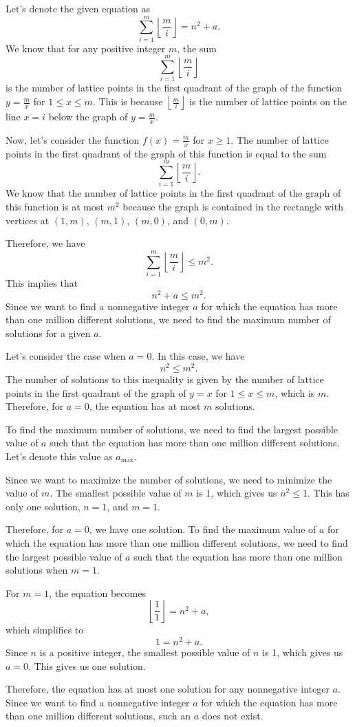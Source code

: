Let's denote the given equation as
\[
\sum_{i=1}^{m} \left\lfloor\frac{m}{i}\right\rfloor = n^2 + a.
\]
We know that for any positive integer \( m \), the sum
\[
\sum_{i=1}^{m} \left\lfloor\frac{m}{i}\right\rfloor
\]
is the number of lattice points in the first quadrant of the graph of the function \( y = \frac{m}{x} \) for \( 1 \leq x \leq m \). This is because \( \left\lfloor\frac{m}{i}\right\rfloor \) is the number of lattice points on the line \( x = i \) below the graph of \( y = \frac{m}{x} \).

Now, let's consider the function \( f(x) = \frac{m}{x} \) for \( x \geq 1 \). The number of lattice points in the first quadrant of the graph of this function is equal to the sum
\[
\sum_{i=1}^{m} \left\lfloor\frac{m}{i}\right\rfloor.
\]
We know that the number of lattice points in the first quadrant of the graph of this function is at most \( m^2 \) because the graph is contained in the rectangle with vertices at \( (1, m) \), \( (m, 1) \), \( (m, 0) \), and \( (0, m) \).

Therefore, we have
\[
\sum_{i=1}^{m} \left\lfloor\frac{m}{i}\right\rfloor \leq m^2.
\]
This implies that
\[
n^2 + a \leq m^2.
\]
Since we want to find a nonnegative integer \( a \) for which the equation has more than one million different solutions, we need to find the maximum number of solutions for a given \( a \).

Let's consider the case when \( a = 0 \). In this case, we have
\[
n^2 \leq m^2.
\]
The number of solutions to this inequality is given by the number of lattice points in the first quadrant of the graph of \( y = x \) for \( 1 \leq x \leq m \), which is \( m \). Therefore, for \( a = 0 \), the equation has at most \( m \) solutions.

To find the maximum number of solutions, we need to find the largest possible value of \( a \) such that the equation has more than one million different solutions. Let's denote this value as \( a_{\text{max}} \).

Since we want to maximize the number of solutions, we need to minimize the value of \( m \). The smallest possible value of \( m \) is 1, which gives us \( n^2 \leq 1 \). This has only one solution, \( n = 1 \), and \( m = 1 \).

Therefore, for \( a = 0 \), we have one solution. To find the maximum value of \( a \) for which the equation has more than one million different solutions, we need to find the largest possible value of \( a \) such that the equation has more than one million solutions when \( m = 1 \).

For \( m = 1 \), the equation becomes
\[
\left\lfloor\frac{1}{1}\right\rfloor = n^2 + a,
\]
which simplifies to
\[
1 = n^2 + a.
\]
Since \( n \) is a positive integer, the smallest possible value of \( n \) is 1, which gives us \( a = 0 \). This gives us one solution.

Therefore, the equation has at most one solution for any nonnegative integer \( a \). Since we want to find a nonnegative integer \( a \) for which the equation has more than one million different solutions, such an \( a \) does not exist.
